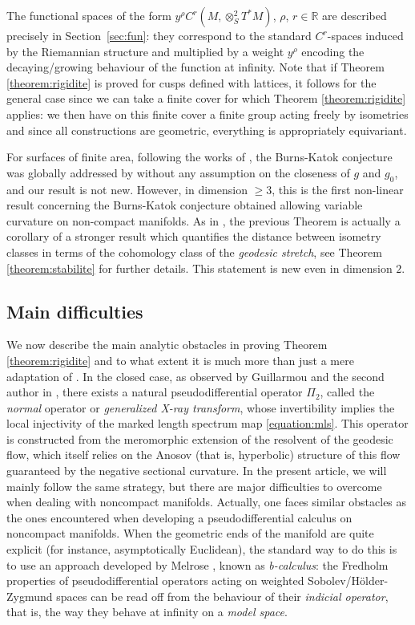 \documentclass[10pt]{amsart}
\newcommand{\R}{\mathbb{R}}
\theoremstyle{plain}
\theoremstyle{definition}
\begin{document}
The functional spaces of the form $y^\rho C^r(M,\otimes^2_S T^*M)$, $\rho$, $r \in \R$ are described precisely in Section~\ref{sec:fun}: they correspond to the standard $C^r$-spaces induced by the Riemannian structure and multiplied by a weight $y^\rho$ encoding the decaying/growing behaviour of the function at infinity. Note that if Theorem \ref{theorem:rigidite} is proved for cusps defined with lattices, it follows for the general case since we can take a finite cover for which Theorem \ref{theorem:rigidite} applies: we then have on this finite cover a finite group acting freely by isometries and since all constructions are geometric, everything is appropriately equivariant.

For surfaces of finite area, following the works of \cite{Croke-90, Otal-90}, the Burns-Katok conjecture was globally addressed by \cite{Cao-95} without any assumption on the closeness of $g$ and $g_0$, and our result is not new. However, in dimension $\geq 3$, this is the first non-linear result concerning the Burns-Katok conjecture obtained allowing variable curvature on non-compact manifolds. As in \cite{Guillarmou-Lefeuvre-18}, the previous Theorem is actually a corollary of a stronger result which quantifies the distance between isometry classes in terms of the cohomology class of the \emph{geodesic stretch}, see Theorem \ref{theorem:stabilite} for further details. This statement is new even in dimension $2$.

\subsection{Main difficulties} We now describe the main analytic obstacles in proving Theorem \ref{theorem:rigidite} and to what extent it is much more than just a mere adaptation of \cite{Guillarmou-Lefeuvre-18}. In the closed case, as observed by Guillarmou and the second author in \cite{Guillarmou-17-1, Guillarmou-Lefeuvre-18}, there exists a natural pseudodifferential operator $\Pi_2$, called the \emph{normal} operator or \emph{generalized X-ray transform}, whose invertibility implies the local injectivity of the marked length spectrum map \eqref{equation:mls}. This operator is constructed from the meromorphic extension of the resolvent of the geodesic flow, which itself relies on the Anosov (that is, hyperbolic) structure of this flow guaranteed by the negative sectional curvature. In the present article, we will mainly follow the same strategy, but there are major difficulties to overcome when dealing with noncompact manifolds. Actually, one faces similar obstacles as the ones encountered when developing a pseudodifferential calculus on noncompact manifolds. When the geometric ends of the manifold are quite explicit (for instance, asymptotically Euclidean), the standard way to do this is to use an approach developed by Melrose \cite{Melrose-APS-93}, known as \emph{b-calculus}: the Fredholm properties of pseudodifferential operators acting on weighted Sobolev/Hölder-Zygmund spaces can be read off from the behaviour of their \emph{indicial operator}, that is, the way they behave at infinity on a \emph{model space}.
\end{document}

